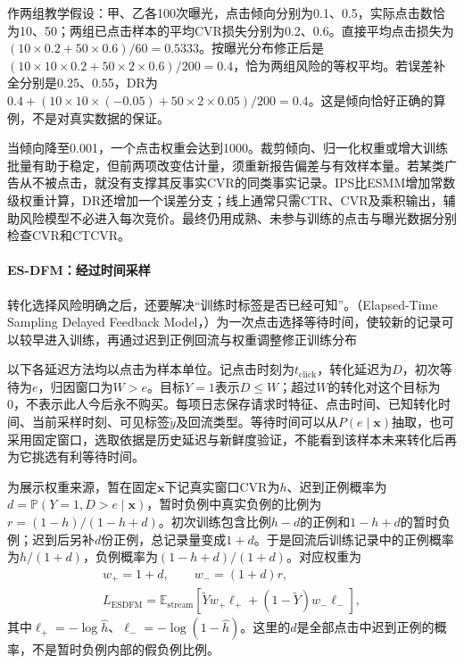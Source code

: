 作两组教学假设：甲、乙各100次曝光，点击倾向分别为0.1、0.5，实际点击数恰为10、50；两组已点击样本的平均CVR损失分别为0.2、0.6。直接平均点击损失为$(10\times0.2+50\times0.6)/60=0.5333$。按曝光分布修正后是$(10\times10\times0.2+50\times2\times0.6)/200=0.4$，恰为两组风险的等权平均。若误差补全分别是0.25、0.55，DR为$0.4+(10\times10\times(-0.05)+50\times2\times0.05)/200=0.4$。这是倾向恰好正确的算例，不是对真实数据的保证。

当倾向降至0.001，一个点击权重会达到1000。裁剪倾向、归一化权重或增大训练批量有助于稳定，但前两项改变估计量，须重新报告偏差与有效样本量。若某类广告从不被点击，就没有支撑其反事实CVR的同类事实记录。IPS比ESMM增加常数级权重计算，DR还增加一个误差分支；线上通常只需CTR、CVR及乘积输出，辅助风险模型不必进入每次竞价。最终仍用成熟、未参与训练的点击与曝光数据分别检查CVR和CTCVR。

\paragraph{ES-DFM：经过时间采样}
\label{sec:rs-advertising-esdfm}

转化选择风险明确之后，还要解决“训练时标签是否已经可知”。（Elapsed-Time Sampling Delayed Feedback Model，）为一次点击选择等待时间，使较新的记录可以较早进入训练，再通过迟到正例回流与权重调整修正训练分布

以下各延迟方法均以点击为样本单位。记点击时刻为$t_{\mathrm{click}}$，转化延迟为$D$，初次等待为$e$，归因窗口为$W>e$。目标$Y=1$表示$D\leq W$；超过$W$的转化对这个目标为0，不表示此人今后永不购买。每项日志保存请求时特征、点击时间、已知转化时间、当前采样时刻、可见标签$\widetilde y$及回流类型。等待时间可以从$P(e\mid\bm{x})$抽取，也可采用固定窗口，选取依据是历史延迟与新鲜度验证，不能看到该样本未来转化后再为它挑选有利等待时间。

为展示权重来源，暂在固定$\bm{x}$下记真实窗口CVR为$h$、迟到正例概率为$d=\mathbb{P}(Y=1,D>e\mid\bm{x})$，暂时负例中真实负例的比例为$r=(1-h)/(1-h+d)$。初次训练包含比例$h-d$的正例和$1-h+d$的暂时负例；迟到后另补$d$份正例，总记录量变成$1+d$。于是回流后训练记录中的正例概率为$h/(1+d)$，负例概率为$(1-h+d)/(1+d)$。对应权重为
\begin{equation}
  \begin{gathered}
    w_+=1+d,\qquad w_-=(1+d)r,\\
    L_{\mathrm{ESDFM}}
    =\mathbb{E}_{\mathrm{stream}}
      [\widetilde Yw_+\ell_+
        +(1-\widetilde Y)w_-\ell_-],
  \end{gathered}
  \label{eq:rs-advertising-esdfm}
\end{equation}
其中$\ell_+=-\log\widehat h$、$\ell_-=-\log(1-\widehat h)$。这里的$d$是全部点击中迟到正例的概率，不是暂时负例内部的假负例比例。

